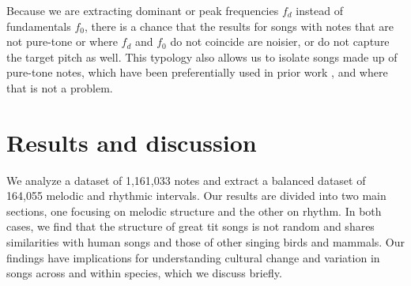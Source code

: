 \noindent Because we are extracting dominant or peak frequencies $f_d$ instead of fundamentals $f_0$, there is a chance that the results for songs with notes that are not pure-tone or where $f_d$ and $f_0$ do not coincide are noisier, or do not capture the target pitch as well. This typology also allows us to isolate songs made up of pure-tone notes, which have been preferentially used in prior work \autocite{dobson1977, tierney2011a, doolittle2012, doolittle2014}, and where that is not a problem.


\section{Results and discussion}

We analyze a dataset of 1,161,033 notes and extract a balanced dataset of 164,055 melodic and rhythmic intervals. Our results are divided into two main sections, one focusing on melodic structure and the other on rhythm. In both cases, we find that the structure of great tit songs is not random and shares similarities with human songs and those of other singing birds and mammals. Our findings have implications for understanding cultural change and variation in songs across and within species, which we discuss briefly.

